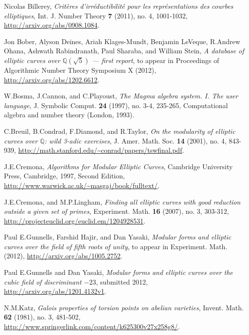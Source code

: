 \documentclass{amsart}
\theoremstyle{definition}
\newcommand{\Q}{\mathbb{Q}}
\begin{document}
\begin{thebibliography}{9}

	Nicolas Billerey,
	\emph{Crit\`eres d'irr\'eductibilit\'e pour les repr\'esentations des courbes elliptiques},
	Int. J. Number Theory \textbf{7} (2011), no. 4, 1001-1032,
	\url{http://arxiv.org/abs/0908.1084}.
	
	Jon Bober, Alyson Deines, Ariah Klages-Mundt, Benjamin LeVeque, R.\thinspace{}Andrew Ohana, Ashwath Rabindranath, Paul Sharaba, and William Stein,
	\emph{A database of elliptic curves over $\Q(\sqrt{5})$ --- first report},
	to appear in Proceedings of Algorithmic Number Theory Symposium X (2012),
	\url{http://arxiv.org/abs/1202.6612}.

	W.\thinspace{}Bosma, J.\thinspace{}Cannon, and C.\thinspace{}Playoust,
	\emph{The Magma algebra system. I. The user language},
	J. Symbolic Comput. \textbf{24} (1997), no. 3-4, 235-265,
	Computational algebra and number theory (London, 1993).

	C.\thinspace{}Breuil, B.\thinspace{}Condrad, F.\thinspace{}Diamond, and R.\thinspace{}Taylor,
	\emph{On the modularity of elliptic curves over $\Q$: wild 3-adic exercises},
	J. Amer. Math. Soc. \textbf{14} (2001), no. 4, 843-939,
	\url{http://math.stanford.edu/~conrad/papers/tswfinal.pdf}.

	J.\thinspace{}E.\thinspace{}Cremona,
	\emph{Algorithms for Modular Elliptic Curves},
	Cambridge University Press, Cambridge, 1997,
	Second Edition,
	\url{http://www.warwick.ac.uk/~masgaj/book/fulltext/}.

	J.\thinspace{}E.\thinspace{}Cremona, and M.\thinspace{}P.\thinspace{}Lingham,
	\emph{Finding all elliptic curves with good reduction outside a given set of primes},
	Experiment. Math. \textbf{16} (2007), no. 3, 303-312,
	\url{http://projecteuclid.org/euclid.em/1204928531}.

	Paul E.\thinspace{}Gunnells, Farshid Hajir, and Dan Yasaki,
	\emph{Modular forms and elliptic curves over the field of fifth roots of unity},
	to appear in Experiment. Math. (2012),
	\url{http://arxiv.org/abs/1005.2752}.

	Paul E.\thinspace{}Gunnells and Dan Yasaki,
	\emph{Modular forms and elliptic curves over the cubic field of discriminant $-23$},
	submitted 2012,
	\url{http://arxiv.org/abs/1201.4132v1}.

	N.\thinspace{}M.\thinspace{}Katz,
	\emph{Galois properties of torsion points on abelian varieties},
	Invent. Math. \textbf{62} (1981), no. 3, 481-502,
	\url{http://www.springerlink.com/content/k625300v27x258g8/}.


\end{thebibliography}
\end{document}
